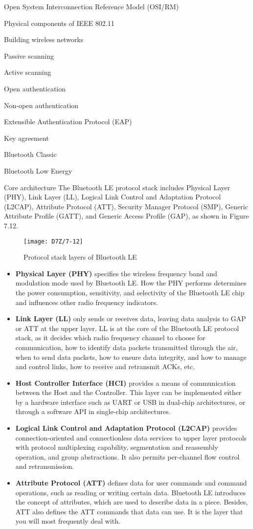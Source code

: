 \documentclass[a4paper,12pt]{book}
\begin{document}
\begin{term}{Open System Interconnection Reference Model (OSI/RM)}
\begin{term}{Physical components of IEEE 802.11}
\begin{term}{Building wireless networks}
\begin{term}{Passive scanning}
\begin{term}{Active scanning}
\begin{term}{Open authentication}
\begin{term}{Non-open authentication}
\begin{term}{Extensible Authentication Protocol (EAP)}
\begin{term}{Key agreement}
\begin{term}{Bluetooth Classic}
\begin{term}{Bluetooth Low Energy}
\begin{term}{Core architecture}
    The Bluetooth LE protocol stack includes Physical Layer (PHY), Link Layer (LL), Logical Link Control and Adaptation Protocol (L2CAP), Attribute Protocol (ATT), Security Manager Protocol (SMP), Generic Attribute Profile (GATT), and Generic Access Profile (GAP), as shown in Figure 7.12.

    \begin{figure}[!h]
        \centering
        \texttt{[image: D7Z/7-12]}
        \caption{Protocol stack layers of Bluetooth LE}
    \end{figure}

    \begin{itemize}
        \item \textbf{Physical Layer (PHY)} specifies the wireless frequency band and modulation mode used by Bluetooth LE. How the PHY performs determines the power consumption, sensitivity, and selectivity of the Bluetooth LE chip and influences other radio frequency indicators.
        \item \textbf{Link Layer (LL)} only sends or receives data, leaving data analysis to GAP or ATT at the upper layer. LL is at the core of the Bluetooth LE protocol stack, as it decides which radio frequency channel to choose for communication, how to identify data packets transmitted through the air, when to send data packets, how to ensure data integrity, and how to manage and control links, how to receive and retransmit ACKs, etc.
        \item \textbf{Host Controller Interface (HCI)} provides a means of communication between the Host and the Controller. This layer can be implemented either by a hardware interface such as UART or USB in dual-chip architectures, or through a software API in single-chip architectures.
        \item \textbf{Logical Link Control and Adaptation Protocol (L2CAP)} provides connection-oriented and connectionless data services to upper layer protocols with protocol multiplexing capability, segmentation and reassembly operation, and group abstractions. It also permits per-channel flow control and retransmission.
        \item \textbf{Attribute Protocol (ATT)} defines data for user commands and command operations, such as reading or writing certain data. Bluetooth LE introduces the concept of attributes, which are used to describe data in a piece. Besides, ATT also defines the ATT commands that data can use. It is the layer that you will most frequently deal with.

\end{itemize}
\end{term}
\end{term}
\end{term}
\end{term}
\end{term}
\end{term}
\end{term}
\end{term}
\end{term}
\end{term}
\end{term}
\end{term}
\end{document}
